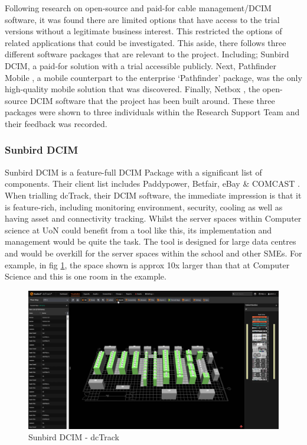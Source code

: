 \documentclass [11pt,a4paper]{article}
\begin{document}
Following research on open-source and paid-for cable management/DCIM software, it was found there are limited options that have access to the trial versions without a legitimate business interest. This restricted the options of related applications that could be investigated. This aside, there follows three different software packages that are relevant to the project. Including; Sunbird DCIM\cite{Sunbird}, a paid-for solution with a trial accessible publicly. Next, Pathfinder Mobile \cite{Pathfinder}, a mobile counterpart to the enterprise `Pathfinder' package, was the only high-quality mobile solution that was discovered. Finally, Netbox \cite{Netbox}, the open-source DCIM software that the project has been built around. These three packages were shown to three individuals within the Research Support Team and their feedback was recorded.

\subsubsection{Sunbird DCIM}
\label{sec:sunbird}
Sunbird DCIM is a feature-full DCIM Package with a significant list of components. Their client list includes Paddypower, Betfair, eBay \& COMCAST \cite{Sunbird-we-know-data-centres}. When trialling dcTrack, their DCIM software, the immediate impression is that it is feature-rich, including monitoring environment, security, cooling as well as having asset and connectivity tracking. Whilst the server spaces within Computer science at UoN could benefit from a tool like this, its implementation and management would be quite the task. The tool is designed for large data centres and would be overkill for the server spaces within the school and other SMEs. For example, in fig \ref{fig:sunbird_dcTrack}, the space shown is approx 10x larger than that at Computer Science and this is one room in the example. 

\begin{figure}[H]
    \centering
    \includegraphics[width=0.7\linewidth]{images/sunbirddcim.png}
    \caption{Sunbird DCIM - dcTrack}
    \label{fig:sunbird_dcTrack}
\end{figure}
\end{document}
